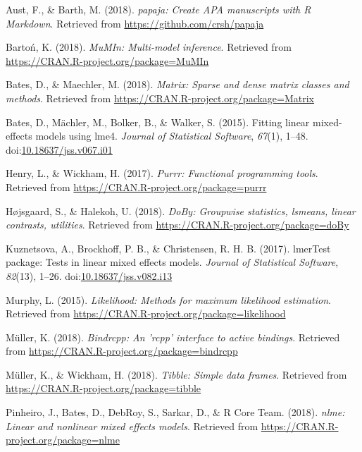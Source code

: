 \documentclass[man]{apa6}
\theoremstyle{definition}
\theoremstyle{definition}
\theoremstyle{definition}
\theoremstyle{remark}
\begin{document}
\begingroup
\setlength{\parindent}{-0.5in} \setlength{\leftskip}{0.5in}

\hypertarget{refs}{}
\hypertarget{ref-R-papaja}{}
Aust, F., \& Barth, M. (2018). \emph{papaja: Create APA manuscripts with
R Markdown}. Retrieved from \url{https://github.com/crsh/papaja}

\hypertarget{ref-R-MuMIn}{}
Bartoń, K. (2018). \emph{MuMIn: Multi-model inference}. Retrieved from
\url{https://CRAN.R-project.org/package=MuMIn}

\hypertarget{ref-R-Matrix}{}
Bates, D., \& Maechler, M. (2018). \emph{Matrix: Sparse and dense matrix
classes and methods}. Retrieved from
\url{https://CRAN.R-project.org/package=Matrix}

\hypertarget{ref-R-lme4}{}
Bates, D., Mächler, M., Bolker, B., \& Walker, S. (2015). Fitting linear
mixed-effects models using lme4. \emph{Journal of Statistical Software},
\emph{67}(1), 1--48.
doi:\href{https://doi.org/10.18637/jss.v067.i01}{10.18637/jss.v067.i01}

\hypertarget{ref-R-purrr}{}
Henry, L., \& Wickham, H. (2017). \emph{Purrr: Functional programming
tools}. Retrieved from \url{https://CRAN.R-project.org/package=purrr}

\hypertarget{ref-R-doBy}{}
Højsgaard, S., \& Halekoh, U. (2018). \emph{DoBy: Groupwise statistics,
lsmeans, linear contrasts, utilities}. Retrieved from
\url{https://CRAN.R-project.org/package=doBy}

\hypertarget{ref-R-lmerTest}{}
Kuznetsova, A., Brockhoff, P. B., \& Christensen, R. H. B. (2017).
lmerTest package: Tests in linear mixed effects models. \emph{Journal of
Statistical Software}, \emph{82}(13), 1--26.
doi:\href{https://doi.org/10.18637/jss.v082.i13}{10.18637/jss.v082.i13}

\hypertarget{ref-R-likelihood}{}
Murphy, L. (2015). \emph{Likelihood: Methods for maximum likelihood
estimation}. Retrieved from
\url{https://CRAN.R-project.org/package=likelihood}

\hypertarget{ref-R-bindrcpp}{}
Müller, K. (2018). \emph{Bindrcpp: An 'rcpp' interface to active
bindings}. Retrieved from
\url{https://CRAN.R-project.org/package=bindrcpp}

\hypertarget{ref-R-tibble}{}
Müller, K., \& Wickham, H. (2018). \emph{Tibble: Simple data frames}.
Retrieved from \url{https://CRAN.R-project.org/package=tibble}

\hypertarget{ref-R-nlme}{}
Pinheiro, J., Bates, D., DebRoy, S., Sarkar, D., \& R Core Team. (2018).
\emph{nlme: Linear and nonlinear mixed effects models}. Retrieved from
\url{https://CRAN.R-project.org/package=nlme}
\end{document}
